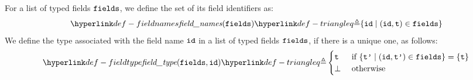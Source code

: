 \begin{mathpar}
\end{mathpar}

\begin{mathpar}
\end{mathpar}

\hypertarget{def-fieldnames}{}
For a list of typed fields $\fields$, we define the set of its field identifiers as:
\[
  \fieldnames(\fields) \triangleq \{ \id \;|\; (\id, \vt) \in \fields\}
\]
\hypertarget{def-fieldtype}{}
We define the type associated with the field name $\id$ in a list of typed fields $\fields$,
if there is a unique one, as follows:
\[
  \fieldtype(\fields, \id) \triangleq
  \begin{cases}
  \vt  & \text{ if }\{ \vtp \;|\; (\id,\vtp) \in \fields\} = \{\vt\}\\
  \bot & \text{ otherwise}
  \end{cases}
\]

